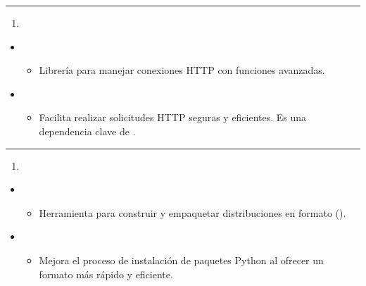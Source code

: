 \documentclass[a4paper,10pt,oneside,spanish,openany]{sphinxmanual}
\begin{document}
\bigskip\hrule\bigskip

\begin{enumerate}
%
\setcounter{enumi}{40}
\item {} 
\sphinxAtStartPar
{}

\end{enumerate}
\begin{itemize}
\item {} 
\sphinxAtStartPar
{}
\begin{itemize}
\item {} 
\sphinxAtStartPar
Librería para manejar conexiones HTTP con funciones avanzadas.

\end{itemize}

\item {} 
\sphinxAtStartPar
{}
\begin{itemize}
\item {} 
\sphinxAtStartPar
Facilita realizar solicitudes HTTP seguras y eficientes. Es una dependencia clave de .

\end{itemize}

\end{itemize}


\bigskip\hrule\bigskip

\begin{enumerate}
%
\setcounter{enumi}{41}
\item {} 
\sphinxAtStartPar
{}

\end{enumerate}
\begin{itemize}
\item {} 
\sphinxAtStartPar
{}
\begin{itemize}
\item {} 
\sphinxAtStartPar
Herramienta para construir y empaquetar distribuciones en formato  ().

\end{itemize}

\item {} 
\sphinxAtStartPar
{}
\begin{itemize}
\item {} 
\sphinxAtStartPar
Mejora el proceso de instalación de paquetes Python al ofrecer un formato más rápido y eficiente.

\end{itemize}

\end{itemize}
\end{document}
